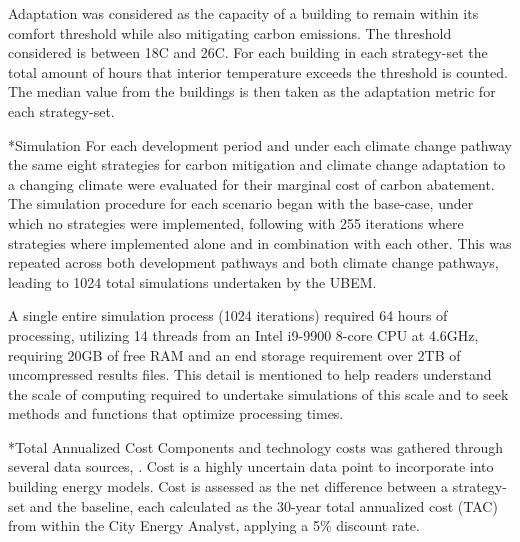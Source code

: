\documentclass[twocolumn, a4paper,10pt]{article}
\makeatletter
\renewcommand\subsection{\@startsection{subsection}{1}{\z@}{\z@}{\z@}{\normalfont\normalsize\bfseries}}
\renewcommand\subsection{\@startsection{subsection}{1}{\z@}{\z@}{0.1pt}{\normalfont\normalsize\bfseries}}
\makeatother
\begin{document}
Adaptation was considered as the capacity of a building to remain within its comfort threshold while also mitigating carbon emissions. The threshold considered is between 18\textdegree C and 26\textdegree C. For each building in each strategy-set the total amount of hours that interior temperature exceeds the threshold is counted. The median value from the buildings is then taken as the adaptation metric for each strategy-set.


\subsection*{Simulation}
For each development period and under each climate change pathway the same eight strategies for carbon mitigation and climate change adaptation to a changing climate were evaluated for their marginal cost of carbon abatement. The simulation procedure for each scenario began with the base-case, under which no strategies were implemented, following with 255 iterations where strategies where implemented alone and in combination with each other. This was repeated across both development pathways and both climate change pathways, leading to 1024 total simulations undertaken by the UBEM.


A single entire simulation process (1024 iterations) required 64 hours of processing, utilizing 14 threads from an Intel i9-9900 8-core CPU at 4.6GHz, requiring 20GB of free RAM and an end storage requirement over 2TB of uncompressed results files. This detail is mentioned to help readers understand the scale of computing required to undertake simulations of this scale and to seek methods and functions that optimize processing times. 

\subsection*{Total Annualized Cost}
Components and technology costs was gathered through several data sources, \citep{noauthor_cpcn_2014,schlueter_3for2_2016,salasovich_energy_2016,kegel_life_nodate,gordian_rsmeans_2020}. Cost is a highly uncertain data point to incorporate into building energy models. Cost is assessed as the net difference between a strategy-set and the baseline, each calculated as the 30-year total annualized cost (TAC) from within the City Energy Analyst, applying a 5\% discount rate.
\end{document}
